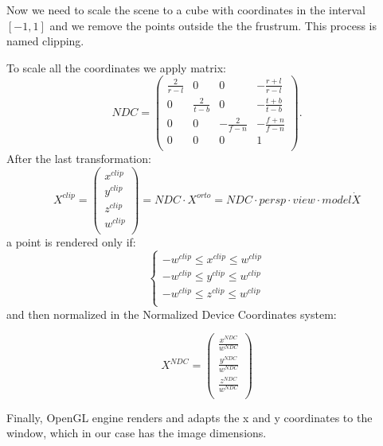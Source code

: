 Now we need to scale the scene to a cube with coordinates in the interval  $[-1,1]$ and we remove the points outside the the frustrum. This process is named clipping.

To scale all the coordinates we apply matrix:
\begin{equation}
 NDC =
 \begin{pmatrix}
  \frac{2}{r-l}   &             0   & 0               & -\frac{r+l}{r-l}\\
  0               & \frac{2}{t-b}  & 0               & -\frac{t+b}{t-b}\\
  0               & 0               & -\frac{2}{f-n}  & -\frac{f+n}{f-n}\\
  0               & 0               & 0               & 1\\
 \end{pmatrix}.
\end{equation}
After the last transformation:
\begin{equation}
 X^{clip} = 
 \begin{pmatrix}
  x^{clip}\\
  y^{clip}\\
  z^{clip}\\
  w^{clip}\\
 \end{pmatrix}
 = NDC \cdot X^{orto} = NDC \cdot persp \cdot view \cdot model \dot X
\end{equation}
a point is rendered  only if:
\begin{equation}
 \begin{cases}
  -w^{clip} \leq x^{clip} \leq w^{clip}\\
  -w^{clip} \leq y^{clip} \leq w^{clip}\\
  -w^{clip} \leq z^{clip} \leq w^{clip}\\
 \end{cases}
\end{equation}
and then normalized in the Normalized Device Coordinates system:

\begin{equation}
 X^{NDC} = 
 \begin{pmatrix}
  \frac{x^{NDC}}{w^{NDC}}\\
  \frac{y^{NDC}}{w^{NDC}}\\
  \frac{z^{NDC}}{w^{NDC}}\\
 \end{pmatrix}
\end{equation}


Finally, OpenGL engine renders and adapts the x and y coordinates to the window, which in our case has the image dimensions.








